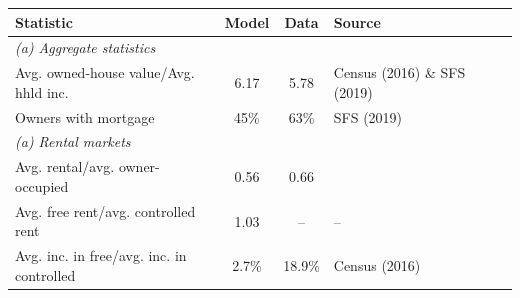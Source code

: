 \begin{table}[p]
\footnotesize
\renewcommand{\arraystretch}{1.2}
\begin{center}
\begin{tabular}{lcclcl}\toprule
Statistic & Model & Data & Source\\
\midrule
\multicolumn{4}{l}{\textit{(a) Aggregate statistics}}\\
Avg. owned-house value/Avg. hhld inc. & 6.17 & 5.78 & Census (2016) \& SFS (2019) \\
Owners with mortgage & 45\% & 63\% & SFS (2019) \\
\multicolumn{4}{l}{\textit{(a) Rental markets}}\\
Avg. rental/avg. owner-occupied & 0.56 & 0.66 & \citet{chatterjee-eyigungor-2015} \\
Avg. free rent/avg. controlled rent & 1.03 & -- & -- \\
Avg. inc. in free/avg. inc. in controlled & 2.7\% & 18.9\% & Census (2016) \\
\bottomrule
\bottomrule
\end{tabular}
\end{center}
\normalsize
\end{table}

